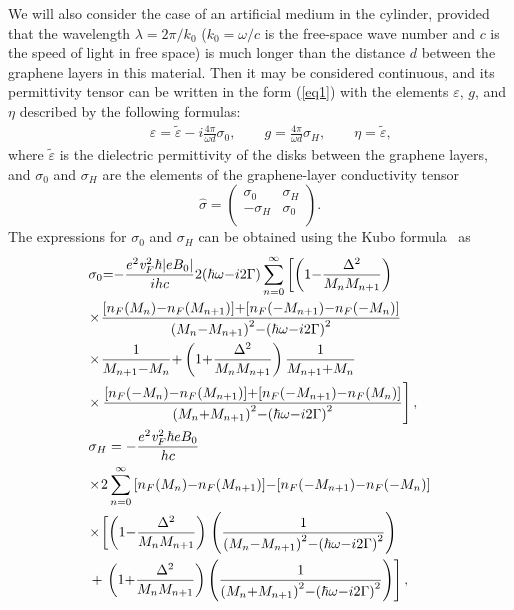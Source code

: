 \documentclass[conference,a4paper]{IEEEtran}
\begin{document}
We will also consider the case of an artificial medium in the cylinder, provided that the wavelength $\lambda=2\pi/k_0$ ($k_0=\omega/c$ is the free-space wave
number and $c$ is the speed of light in free space) is much longer than the distance $d$ between the graphene layers in this material. Then it may be considered continuous, and its permittivity tensor can be written in the form (\ref{eq1}) with the elements $\varepsilon$, $g$, and $\eta$ described by the following formulas:
\begin{eqnarray}\label{eq3}
&&\varepsilon  = \tilde \varepsilon  - i \frac{{4\pi }}{{\omega d}}{\sigma _0},\qquad g = \frac{{4\pi }}{{\omega d}}{\sigma _H},\qquad \eta  = \tilde \varepsilon,
\end{eqnarray}
where $\tilde{\varepsilon}$ is the dielectric permittivity of the disks between the graphene layers, and $\sigma_0$ and $\sigma_H$ are the elements of the graphene-layer conductivity tensor
\begin{equation}\label{eq4a}
{\hat \sigma} =
\left(\begin{array}{cc}
{{\sigma _0}}&{{\sigma _H}}\\
{ - {\sigma _H}}&{{\sigma _0}}\\
\end{array} \right).
\end{equation}
The expressions for $\sigma_0$ and $\sigma_H$ can be obtained using the Kubo formula~\cite{Gusynin2007} as
\begin{align}\label{eq1_appA}
&{\sigma_0} {=}  {-} \frac{{{e^2}{\it v}_F^{\rm{2}}\hbar |e{B_0}|}}{{ihc}}2(\hbar \omega {-}i2\Gamma )  \sum\limits_{n = 0}^\infty  {\left[ {\left( {1{-}\frac{{{\Delta ^2}}}{{{M_n}{M_{n{+}1}}}}} \right)} \right.} \nonumber\\
&\!\times\! {\frac{{[{n_F}({M_n}){-}{n_F}({M_{n{+}1}})]{+}[{n_F}({-}{M_{n{+}1}}){-}{n_F}({-}{M_n})]}}{{{{({M_n}{-}{M_{n{+}1}})}^2}{-}{{(\hbar \omega {-}i2\Gamma )}^2}}}} \nonumber\\
&\!\times\! \frac{1}{{{M_{n{+}1}}{-}{M_n}}}{+}\left( {1{+}\frac{{{\Delta ^2}}}{{{M_n}{M_{n{+}1}}}}} \right)\frac{1}{{{M_{n{+}1}}{+}{M_n}}}\nonumber\\
&\!\times\!  \left. {\frac{{[{n_F}({-}{M_n}){-}{n_F}({M_{n{+}1}})]{+}[{n_F}({-}{M_{n{+}1}}){-}{n_F}({M_n})]}}{{{{({M_n}{+}{M_{n{+}1}})}^2}{-}{{(\hbar \omega {-}i2\Gamma )}^2}}}} \right],\nonumber\\
&{\sigma _H} = {-}\frac{{{e^2}{\it v}_F^{\rm{2}}\hbar e{B_0}}}{{hc}} \nonumber\\
&\!\times\! 2\sum\limits_{n = 0}^\infty  {[{n_F}({M_n}){-}{n_F}({M_{n{+}1}})]{-}[{n_F}({-}{M_{n{+}1}}){-}{n_F}({-}{M_n})] } \nonumber\\
&\!\times\! \left[ {\left( {1{-}\frac{{{\Delta ^2}}}{{{M_n}{M_{n{+}1}}}}} \right)} \right.\left( {\frac{1}{{{{({M_n}{-}{M_{n{+}1}})}^2}{-}{{(\hbar \omega {-}i2\Gamma )}^2}}}} \right)\left. \right.\nonumber\\
&+ \left.\left( {1{+}\frac{{{\Delta ^2}}}{{{M_n}{M_{n{+}1}}}}} \right)\left( {\frac{1}{{{{({M_n}{+}{M_{n{+}1}})}^2}{-}{{(\hbar \omega {-}i2\Gamma )}^2}}}} \right) \right],
\end{align}
\end{document}
